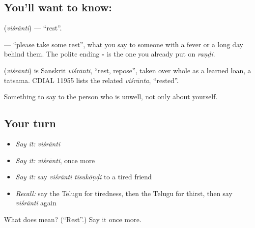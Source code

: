 \subsection*{You'll want to know: }
\textbf{} (\emph{viśrānti}) — \textquotedblleft{}rest\textquotedblright{}.

\textbf{ } — \textquotedblleft{}please take some rest\textquotedblright{}, what you say to someone with a fever or a long day behind them. The polite ending \textbf{-} is the one you already put on \emph{raṇḍi}.

\begin{cousinweb}
\textbf{} (\emph{viśrānti}) is Sanskrit \emph{viśrānti}, \textquotedblleft{}rest, repose\textquotedblright{}, taken over whole as a learned loan, a tatsama. CDIAL 11955 lists the related \emph{viśrānta}, \textquotedblleft{}rested\textquotedblright{}.
\end{cousinweb}

\begin{grammarlens}[title={What you've built}]
Something to say to the person who is unwell, not only about yourself.
\end{grammarlens}

\subsection*{Your turn}
\begin{itemize}
\raggedright
  \item \emph{Say it:} \emph{viśrānti}
  \item \emph{Say it:} \emph{viśrānti}, once more
  \item \emph{Say it:} say \emph{viśrānti tīsukōṇḍi} to a tired friend
  \item \emph{Recall:} say the Telugu for tiredness, then the Telugu for thirst, then say \emph{viśrānti} again
\end{itemize}

\begin{tcolorbox}[breakable,colback=teal!4,colframe=teal!35!black,title={Before you move on}]
What does  mean? (\textquotedblleft{}Rest\textquotedblright{}.) Say it once more.
\end{tcolorbox}
